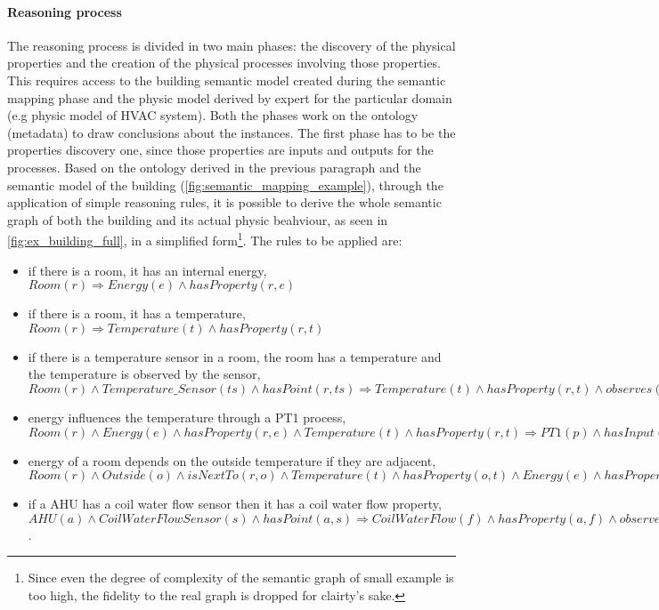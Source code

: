 \paragraph{Reasoning process}
The reasoning process is divided in two main phases: the discovery of the physical properties and the creation of the physical processes involving those properties. This requires access to the building semantic model created during the semantic mapping phase and the physic model derived by expert for the particular domain (e.g physic model of HVAC system). Both the phases work on the ontology (metadata) to draw conclusions about the instances. The first phase has to be the properties discovery one, since those properties are inputs and outputs for the processes. Based on the ontology derived in the previous paragraph and the semantic model of the building (\autoref{fig:semantic_mapping_example}), through the application of simple reasoning rules, it is possible to derive the whole semantic graph of both the building and its actual physic beahviour, as seen in \autoref{fig:ex_building_full}, in a simplified form\footnote{Since even the degree of complexity of the semantic graph of small example is too high, the fidelity to the real graph is dropped for clairty's sake.}.
The rules to be applied are:
\begin{itemize}
  \item if there is a room, it has an internal energy, $Room(r)\Rightarrow Energy(e)\wedge hasProperty(r,e)$
  \item if there is a room, it has a temperature, $Room(r)\Rightarrow Temperature(t)\wedge hasProperty(r,t)$
  \item if there is a temperature sensor in a room, the room has a temperature and the temperature is observed by the sensor, $Room(r)\wedge Temperature\_Sensor(ts)\wedge hasPoint(r,ts)\Rightarrow Temperature(t)\wedge hasProperty(r,t)\wedge observes(s,t)$
  \item energy influences the temperature through a PT1 process, $Room(r)\wedge Energy(e)\wedge hasProperty(r,e)\wedge Temperature(t)\wedge hasProperty(r,t)\Rightarrow PT1(p)\wedge hasInput(p,e)\wedge hasOutput(p,t)$
  \item energy of a room depends on the outside temperature if they are adjacent, $Room(r)\wedge Outside(o)\wedge isNextTo(r,o)\wedge Temperature(t)\wedge hasProperty(o,t)\wedge Energy(e)\wedge hasProperty(r,e)\Rightarrow PP(p)\wedge hasInput(p,t)\wedge hasOutput(p,e)$
  \item if a AHU has a coil water flow sensor then it has a coil water flow property, $AHU(a)\wedge CoilWaterFlowSensor(s)\wedge hasPoint(a,s)\Rightarrow CoilWaterFlow(f)\wedge hasProperty(a,f)\wedge observes(s,f)$.
\end{itemize}
